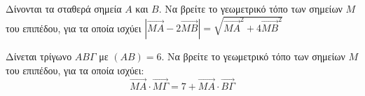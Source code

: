 \documentclass{presentation}
\begin{document}
\begin{askisi}
  Δίνονται τα σταθερά σημεία $Α$ και $Β$. Να βρείτε το γεωμετρικό τόπο των σημείων $Μ$ του επιπέδου, για τα οποία ισχύει $|\overrightarrow{ΜΑ}-2\overrightarrow{ΜΒ}|=\sqrt{\overrightarrow{ΜΑ}^2+4\overrightarrow{ΜΒ}^2}$

\end{askisi}

\begin{askisi}
  Δίνεται τρίγωνο $ΑΒΓ$ με $(ΑΒ)=6$. Να βρείτε το γεωμετρικό τόπο των σημείων $Μ$ του επιπέδου, για τα οποία ισχύει:
  $$\overrightarrow{ΜΑ}\cdot \overrightarrow{ΜΓ}=7+\overrightarrow{ΜΑ}\cdot \overrightarrow{ΒΓ}$$

\end{askisi}

\moodle
\end{document}
